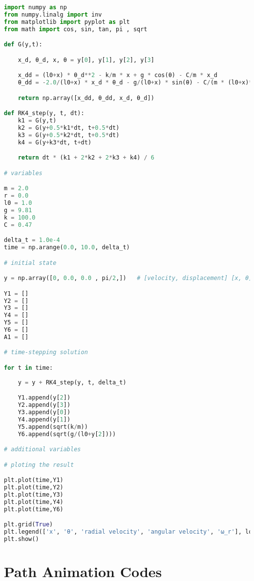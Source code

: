         \clearpage
        
        \begin{lstlisting}[language=Python, caption=\textit{Graphical Solution Python Script for system \textbf{with} Damping}]
import numpy as np 
from numpy.linalg import inv
from matplotlib import pyplot as plt
from math import cos, sin, tan, pi , sqrt

def G(y,t): 	

    x_d, θ_d, x, θ = y[0], y[1], y[2], y[3]

	x_dd = (l0+x) * θ_d**2 - k/m * x + g * cos(θ) - C/m * x_d	
	θ_dd = -2.0/(l0+x) * x_d * θ_d - g/(l0+x) * sin(θ) - C/(m * (l0+x)**2) * θ_d	

	return np.array([x_dd, θ_dd, x_d, θ_d])

def RK4_step(y, t, dt):
	k1 = G(y,t)
	k2 = G(y+0.5*k1*dt, t+0.5*dt)
	k3 = G(y+0.5*k2*dt, t+0.5*dt)
	k4 = G(y+k3*dt, t+dt)

	return dt * (k1 + 2*k2 + 2*k3 + k4) / 6

# variables

m = 2.0
r = 0.0
l0 = 1.0
g = 9.81
k = 100.0
C = 0.47

delta_t = 1.0e-4
time = np.arange(0.0, 10.0, delta_t)

# initial state

y = np.array([0, 0.0, 0.0 , pi/2,])   # [velocity, displacement] [x, θ] 

Y1 = []
Y2 = []
Y3 = []
Y4 = []
Y5 = []
Y6 = []
A1 = []

# time-stepping solution

for t in time:
	
	y = y + RK4_step(y, t, delta_t) 

	Y1.append(y[2])
	Y2.append(y[3])
	Y3.append(y[0])
	Y4.append(y[1])
	Y5.append(sqrt(k/m))
	Y6.append(sqrt(g/(l0+y[2])))

# additional variables

# ploting the result

plt.plot(time,Y1)
plt.plot(time,Y2)
plt.plot(time,Y3)
plt.plot(time,Y4)
plt.plot(time,Y6)

plt.grid(True)
plt.legend(['x', 'θ', 'radial velocity', 'angular velocity', 'ω_r'], loc='lower right')
plt.show()

\end{lstlisting}
        
\clearpage
        
    \section{{Path Animation Codes}}
        
